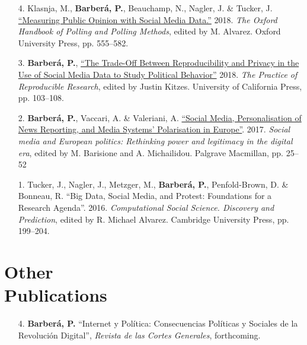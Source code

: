 \documentclass[margin,line,11pt]{resume}
\begin{document}
\begin{resume}
\begin{itemize}[leftmargin=5.5mm]
\item[4.] Klasnja, M., \textbf{Barber\'{a}, P.}, Beauchamp, N., Nagler, J. \& Tucker, J. \href{http://www.oxfordhandbooks.com/view/10.1093/oxfordhb/9780190213299.001.0001/oxfordhb-9780190213299-e-3}{``Measuring Public Opinion with Social Media Data.''} 2018. \textit{The Oxford Handbook of Polling and Polling Methods}, edited by M. Alvarez. Oxford University Press, pp. 555--582.

\item[3.] \textbf{Barber\'{a}, P.}, \href{https://www.practicereproducibleresearch.org/case-studies/barbera.html}{``The Trade-Off Between Reproducibility and Privacy in the Use of Social Media Data to Study Political Behavior''} 2018. \textit{The Practice of Reproducible Research}, edited by Justin Kitzes. University of California Press, pp. 103--108. 

\item[2.] \textbf{Barber\'{a}, P.}, Vaccari, A. \& Valeriani, A. \href{https://link.springer.com/chapter/10.1057/978-1-137-59890-5_2}{``Social Media, Personalisation of News Reporting, and Media Systems' Polarisation in Europe''}. 2017. \textit{Social media and European politics: Rethinking power and legitimacy in the digital era}, edited by M. Barisione and A. Michailidou. Palgrave Macmillan, pp. 25--52

\item[1.] Tucker, J., Nagler, J., Metzger, M., \textbf{Barber\'{a}, P.}, Penfold-Brown, D. \& Bonneau, R. ``Big Data, Social Media, and Protest: Foundations for a Research Agenda''. 2016. \textit{Computational Social Science. Discovery and Prediction}, edited by R. Michael Alvarez. Cambridge University Press, pp. 199--204.
\end{itemize}


\section{\mysidestyle Other\\Publications}
    \vspace{.15cm}    
\begin{itemize}[leftmargin=5.5mm]
\item[4.] \textbf{Barber\'{a}, P.} ``Internet y Pol\'{i}tica: Consecuencias Pol\'{i}ticas y Sociales de la Revoluci\'{o}n Digital'', \textit{Revista de las Cortes Generales}, forthcoming.


\end{itemize}
\end{resume}
\end{document}
